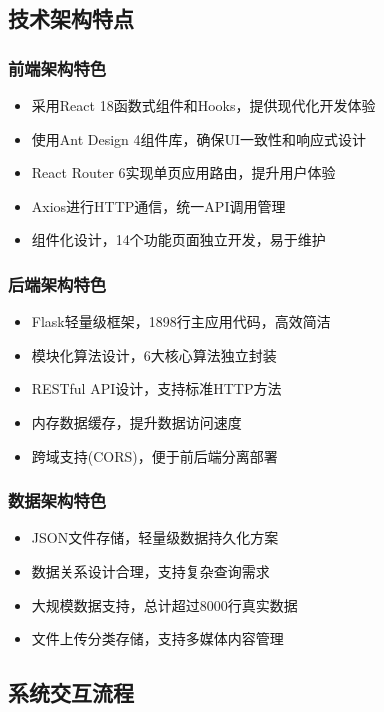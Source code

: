 \documentclass[12pt,a4paper]{article}
\begin{document}
\subsection{技术架构特点}

\subsubsection{前端架构特色}
\begin{itemize}
    \item 采用React 18函数式组件和Hooks，提供现代化开发体验
    \item 使用Ant Design 4组件库，确保UI一致性和响应式设计
    \item React Router 6实现单页应用路由，提升用户体验
    \item Axios进行HTTP通信，统一API调用管理
    \item 组件化设计，14个功能页面独立开发，易于维护
\end{itemize}

\subsubsection{后端架构特色}
\begin{itemize}
    \item Flask轻量级框架，1898行主应用代码，高效简洁
    \item 模块化算法设计，6大核心算法独立封装
    \item RESTful API设计，支持标准HTTP方法
    \item 内存数据缓存，提升数据访问速度
    \item 跨域支持(CORS)，便于前后端分离部署
\end{itemize}

\subsubsection{数据架构特色}
\begin{itemize}
    \item JSON文件存储，轻量级数据持久化方案
    \item 数据关系设计合理，支持复杂查询需求
    \item 大规模数据支持，总计超过8000行真实数据
    \item 文件上传分类存储，支持多媒体内容管理
\end{itemize}

\subsection{系统交互流程}
\end{document}
